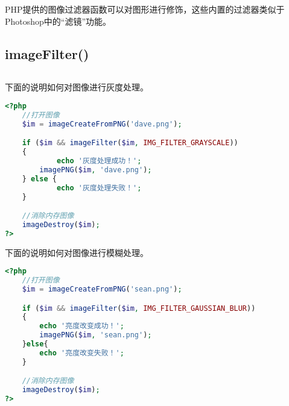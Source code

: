 PHP提供的图像过滤器函数可以对图形进行修饰，这些内置的过滤器类似于Photoshop中的“滤镜”功能。


\subsection{imageFilter()}



\begin{lstlisting}[language=PHP]

\end{lstlisting}

下面的说明如何对图像进行灰度处理。


\begin{lstlisting}[language=PHP]
<?php
	//打开图像
	$im = imageCreateFromPNG('dave.png');

	if ($im && imageFilter($im, IMG_FILTER_GRAYSCALE)) 
	{
    		echo '灰度处理成功！';
	    imagePNG($im, 'dave.png');
	} else {
    		echo '灰度处理失败！';
	}

	//消除内存图像
	imageDestroy($im);
?>
\end{lstlisting}


下面的说明如何对图像进行模糊处理。



\begin{lstlisting}[language=PHP]
<?php
	//打开图像
	$im = imageCreateFromPNG('sean.png');

	if ($im && imageFilter($im, IMG_FILTER_GAUSSIAN_BLUR)) 
	{
	    echo '亮度改变成功！';
	    imagePNG($im, 'sean.png');
	}else{
	    echo '亮度改变失败！';
	}

	//消除内存图像
	imageDestroy($im);
?>
\end{lstlisting}





\begin{lstlisting}[language=PHP]

\end{lstlisting}





\begin{lstlisting}[language=PHP]

\end{lstlisting}




\begin{lstlisting}[language=PHP]

\end{lstlisting}




